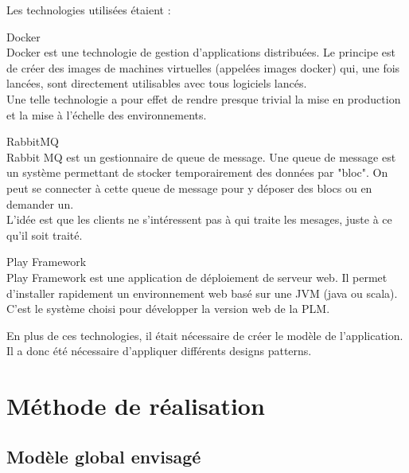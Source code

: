 \documentclass[stage]{tnreport}
\begin{document}
Les technologies utilisées étaient :
\begin{description}
	\item{Docker} \hfill \\
		Docker est une technologie de gestion d'applications distribuées. Le principe est de créer des images de machines virtuelles (appelées images docker) qui, une fois lancées, sont directement utilisables avec tous logiciels lancés. \\
		Une telle technologie a pour effet de rendre presque trivial la mise en production et la mise à l'échelle des environnements.
	\item{RabbitMQ} \hfill \\
		Rabbit MQ\cite{RMQ-WS} est un gestionnaire de queue de message. Une queue de message est un  système permettant de stocker temporairement des données par "bloc". On peut se connecter à cette queue de message pour y déposer des blocs ou en demander un. \\
		L'idée est que les clients ne s'intéressent pas à qui traite les mesages, juste à ce qu'il soit traité.
	\item{Play Framework} \hfill \\
		Play Framework est une application de déploiement de serveur web. Il permet d'installer rapidement un environnement web basé sur une JVM (java ou scala). C'est le système choisi pour développer la version web de la PLM.
\end{description}

En plus de ces technologies, il était nécessaire de créer le modèle de l'application. Il a donc été nécessaire d'appliquer différents designs patterns.

\section{Méthode de réalisation}

\subsection{Modèle global envisagé}
\end{document}
